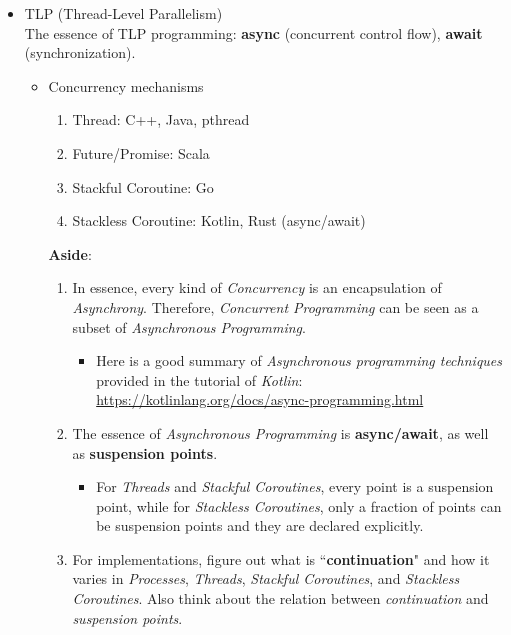\documentclass{article}
\begin{document}
\begin{itemize}
    \item TLP (Thread-Level Parallelism)\\
    The essence of TLP programming: \textbf{async} (concurrent control flow), \textbf{await} (synchronization).
    \begin{itemize}
        \item Concurrency mechanisms
        \begin{enumerate}
            \item Thread: C++, Java, pthread
            \item Future/Promise: Scala
            \item Stackful Coroutine: Go
            \item Stackless Coroutine: Kotlin, Rust (async/await)
        \end{enumerate}
        \textbf{Aside}:
        \begin{enumerate}
            \item In essence, every kind of \emph{Concurrency} is an encapsulation of \emph{Asynchrony}.
        Therefore, \emph{Concurrent Programming} can be seen as a subset of \emph{Asynchronous Programming}.
            \begin{itemize}
                \item Here is a good summary of \emph{Asynchronous programming techniques} provided in the tutorial of \emph{Kotlin}:
            \href{https://kotlinlang.org/docs/async-programming.html}{https://kotlinlang.org/docs/async-programming.html}
            \end{itemize}
            \item The essence of \emph{Asynchronous Programming} is \textbf{async/await}, as well as \textbf{suspension points}.
            \begin{itemize}
                \item For \emph{Threads} and \emph{Stackful Coroutines}, every point is a suspension point, while for \emph{Stackless Coroutines}, only a fraction of points can be suspension points and they are declared explicitly.
            \end{itemize}
            \item For implementations, figure out what is ``\textbf{continuation}" and how it varies in \emph{Processes}, \emph{Threads}, \emph{Stackful Coroutines}, and \emph{Stackless Coroutines}.
            Also think about the relation between \emph{continuation} and \emph{suspension points}.
        \end{enumerate}


\end{itemize}
\end{itemize}
\end{document}
